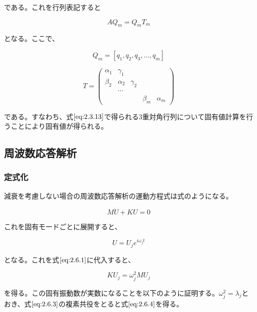 \documentclass[a4paper,pandoc,ja=standard]{bxjsarticle}
\begin{document}
である。これを行列表記すると

\begin{equation}
AQ_m = Q_m T_m
\label{eq:2.3.13}
\end{equation}

となる。ここで、

\[
Q_m = [q_{1}, q_{2}, q_{3}, \ldots ,q_{m}]
\]

\begin{equation}
T=
\begin{pmatrix}
  \alpha_{1} & \gamma_{1} & & &\\
  \beta_{2}  & \alpha_{2} & \gamma_{2} & &  \\
             & \cdots & & &\\
  & & & \beta_{m} & \alpha_{m}
\end{pmatrix}
\label{2.3.14}
\end{equation}

である。すなわち、式\(\eqref{eq:2.3.13}\)で得られる3重対角行列について固有値計算を行うことにより固有値が得られる。

\hypertarget{ux5468ux6ce2ux6570ux5fdcux7b54ux89e3ux6790}{%
\subsection{周波数応答解析}\label{ux5468ux6ce2ux6570ux5fdcux7b54ux89e3ux6790}}

\hypertarget{ux5b9aux5f0fux5316-1}{%
\subsubsection{定式化}\label{ux5b9aux5f0fux5316-1}}

減衰を考慮しない場合の周波数応答解析の運動方程式は式のようになる。

\begin{equation}
M \ddot{U} + K U = 0
\label{eq:2.6.1}
\end{equation}

これを固有モードごとに展開すると、

\begin{equation}
U = U_j e^{i \omega_j t}
\label{eq:2.6.2}
\end{equation}

となる。これを式\(\eqref{eq:2.6.1}\)に代入すると、

\begin{equation}
K U_j = \omega_j^2 M U_j
\label{eq:2.6.3}
\end{equation}

を得る。この固有振動数が実数になることを以下のように証明する。\(\omega_j^2 = \lambda_j\)とおき、式\(\eqref{eq:2.6.3}\)の複素共役をとると式\(\eqref{eq:2.6.4}\)を得る。
\end{document}
